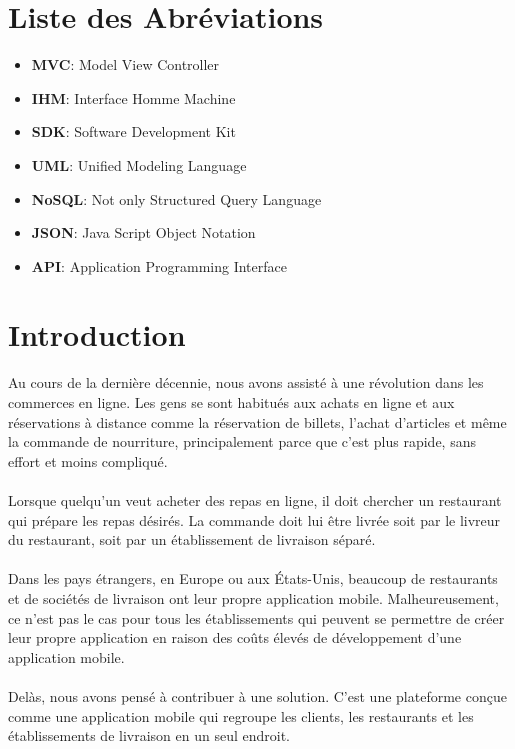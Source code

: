 \documentclass[french, a4paper, 12pt]{report}
\begin{document}
\chapter*{Liste des Abréviations}
	\begin{itemize}
		\item \textbf{MVC}:  Model View Controller
		\item \textbf{IHM}: Interface Homme Machine
		\item \textbf{SDK}: Software Development Kit
		\item \textbf{UML}: Unified Modeling Language
		\item \textbf{NoSQL}: Not only Structured Query Language
		\item \textbf{JSON}:  Java Script Object Notation
		\item \textbf{API}:  Application Programming Interface
	\end{itemize}


\newpage
\chapter*{Introduction}
    Au cours de la dernière décennie, nous avons assisté à une révolution dans les commerces en ligne. Les gens se sont habitués aux achats en ligne et aux réservations à distance comme la réservation de billets, l'achat d'articles et même la commande de nourriture, principalement parce que c'est plus rapide, sans effort et moins compliqué.\\\\

Lorsque quelqu'un veut acheter des repas en ligne, il doit chercher un restaurant qui prépare les repas désirés. La commande doit lui être livrée soit par le livreur du restaurant, soit par un établissement de livraison séparé.\\\\

Dans les pays étrangers, en Europe ou aux États-Unis, beaucoup de restaurants et de sociétés de livraison ont leur propre application mobile. Malheureusement, ce n'est pas le cas pour tous les établissements qui peuvent se permettre de créer leur propre application en raison des coûts élevés de développement d'une application mobile.\\\\

Delàs, nous avons pensé à contribuer à une solution. C'est une plateforme conçue comme une application mobile qui regroupe les clients, les restaurants et les établissements de livraison en un seul endroit. \\\\
\end{document}
